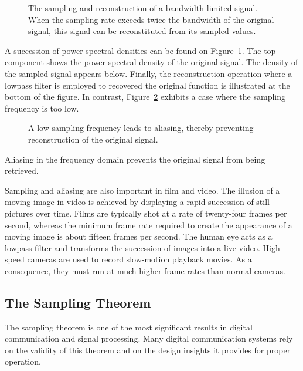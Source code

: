 \begin{figure}[thbp]
\begin{center}
\caption{The sampling and reconstruction of a bandwidth-limited signal.
When the sampling rate exceeds twice the bandwidth of the original signal, this signal can be reconstituted from its sampled values.}
\label{figure:Sampling}
\end{center}
\end{figure}
A succession of power spectral densities can be found on Figure~\ref{figure:Sampling}.
The top component shows the power spectral density of the original signal.
The density of the sampled signal appears below.
Finally, the reconstruction operation where a lowpass filter is employed to recovered the original function is illustrated at the bottom of the figure.
In contrast, Figure~\ref{figure:Aliasing} exhibits a case where the sampling frequency is too low.
\begin{figure}[thbp]
\begin{center}
\caption{A low sampling frequency leads to aliasing, thereby preventing reconstruction of the original signal.}
\label{figure:Aliasing}
\end{center}
\end{figure}
Aliasing in the frequency domain prevents the original signal from being retrieved.

Sampling and aliasing are also important in film and video.
The illusion of a moving image in video is achieved by displaying a rapid succession of still pictures over time.
Films are typically shot at a rate of twenty-four frames per second, whereas the minimum frame rate required to create the appearance of a moving image is about fifteen frames per second.
The human eye acts as a lowpass filter and transforms the succession of images into a live video.
High-speed cameras are used to record slow-motion playback movies.
As a consequence, they must run at much higher frame-rates than normal cameras.

\subsection{The Sampling Theorem}

The sampling theorem is one of the most significant results in digital communication and signal processing.
Many digital communication systems rely on the validity of this theorem and on the design insights it provides for proper operation.

